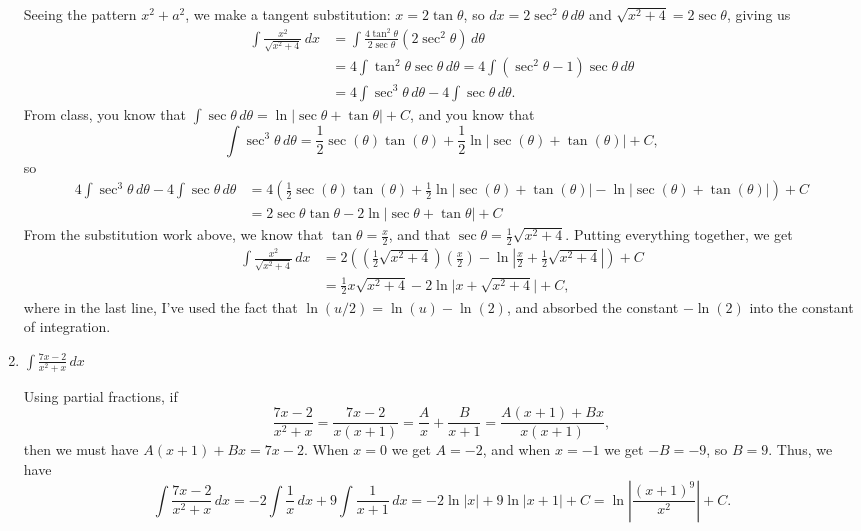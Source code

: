 \documentclass[12pt]{article}
\newcommand{\di}{\displaystyle}
\newcommand{\abs}[1]{\lvert #1\rvert}
\begin{document}
\begin{enumerate}
Seeing the pattern $x^2+a^2$, we make a tangent substitution: $x=2\tan\theta$, so $dx = 2\sec^2\theta\,d\theta$ and $\sqrt{x^2+4} = 2\sec\theta$, giving us
\begin{align*}
 \int\frac{x^2}{\sqrt{x^2+4}}\,dx & = \int\frac{4\tan^2\theta}{2\sec\theta}(2\sec^2\theta)\,d\theta\\
 & = 4\int \tan^2\theta\sec\theta\,d\theta = 4\int (\sec^2\theta-1)\sec\theta\,d\theta\\
 & = 4\int \sec^3\theta\,d\theta - 4\int \sec\theta\,d\theta.
\end{align*}
From class, you know that $\int \sec\theta\,d\theta = \ln\abs{\sec\theta+\tan\theta}+C$, and you know that
\[
 \int \sec^3\theta\,d\theta = \frac{1}{2}\sec(\theta)\tan(\theta)+\frac{1}{2}\ln\lvert \sec(\theta)+\tan(\theta)\rvert +C,
\]
so 
\begin{align*}
\di 4\int \sec^3\theta\,d\theta - 4\int \sec\theta\,d\theta &= 4\left(\frac{1}{2}\sec(\theta)\tan(\theta)+\frac{1}{2}\ln\lvert \sec(\theta)+\tan(\theta)\rvert-\ln\lvert \sec(\theta)+\tan(\theta)\rvert\right)+C\\
& = 2\sec\theta\tan\theta-2\ln\abs{\sec\theta+\tan\theta}+C 
\end{align*}
From the substitution work above, we know that $\tan\theta = \frac{x}{2}$, and that $\sec\theta = \frac{1}{2}\sqrt{x^2+4}$. Putting everything together, we get 
\begin{align*}
 \int \frac{x^2}{\sqrt{x^2+4}}\,dx &= 2\left(\left(\frac{1}{2}\sqrt{x^2+4}\right)\left(\frac{x}{2}\right) - \ln\left|\frac{x}{2}+\frac{1}{2}\sqrt{x^2+4}\right|\right)+C\\
 & = \frac{1}{2}x\sqrt{x^2+4}-2\ln\abs{x+\sqrt{x^2+4}}+C,
\end{align*}
where in the last line, I've used the fact that $\ln(u/2) = \ln(u) - \ln(2)$, and absorbed the constant $-\ln(2)$ into the constant of integration.

 
  \item $\di \int \frac{7x-2}{x^2+x}\,dx$
  
  \medskip
  
  Using partial fractions, if
\[
 \frac{7x-2}{x^2+x} = \frac{7x-2}{x(x+1)} = \frac{A}{x}+\frac{B}{x+1} = \frac{A(x+1)+Bx}{x(x+1)},
\]
then we must have $A(x+1)+Bx = 7x-2$. When $x=0$ we get $A=-2$, and when $x=-1$ we get $-B=-9$, so $B=9$. Thus, we have
\[
 \int\frac{7x-2}{x^2+x}\,dx = -2\int\frac{1}{x}\,dx + 9\int\frac{1}{x+1}\,dx = -2\ln\abs{x}+9\ln\abs{x+1}+C = \ln\left|\frac{(x+1)^9}{x^2}\right|+C.
\]


\end{enumerate}
\end{document}

